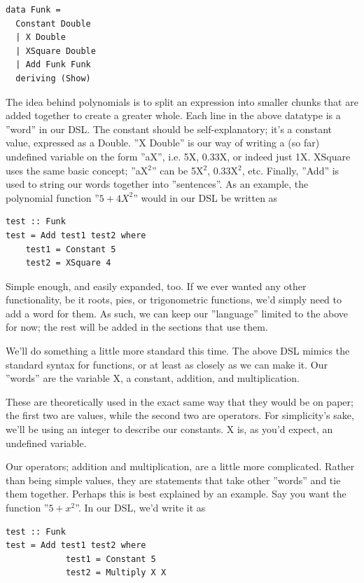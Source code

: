 \begin{verbatim}
data Funk =
  Constant Double
  | X Double
  | XSquare Double
  | Add Funk Funk
  deriving (Show)
\end{verbatim}

The idea behind polynomials is to split an expression into smaller chunks that are added together to create a greater whole. Each line in the above datatype is a ''word'' in our DSL. The constant should be self-explanatory; it's a constant value, expressed as a Double. ''X Double'' is our way of writing a (so far) undefined variable on the form ''aX'', i.e. 5X, 0.33X, or indeed just 1X. XSquare uses the same basic concept; ''aX$^2$'' can be 5X$^2$, 0.33X$^2$, etc.
Finally, ''Add'' is used to string our words together into ''sentences''. As an example, the polynomial function ''$5 + 4X^2$'' would in our DSL be written as
\begin{verbatim}
test :: Funk
test = Add test1 test2 where
    test1 = Constant 5
    test2 = XSquare 4
\end{verbatim}
Simple enough, and easily expanded, too. If we ever wanted any other functionality, be it roots, pies, or trigonometric functions, we'd simply need to add a word for them. As such, we can keep our ''language'' limited to the above for now; the rest will be added in the sections that use them.

\iffalse
We'll do something a little more standard this time. The above DSL mimics the standard syntax for functions, or at least as closely as we can make it. Our ''words'' are the variable X, a constant, addition, and multiplication.

These are theoretically used in the exact same way that they would be on paper; the first two are values, while the second two are operators. For simplicity's sake, we'll be using an integer to describe our constants. X is, as you'd expect, an undefined variable.

Our operators; addition and multiplication, are a little more complicated. Rather than being simple values, they are statements that take other ''words'' and tie them together. Perhaps this is best explained by an example. Say you want the function ''$5 + x^2$''. In our DSL, we'd write it as
\begin{verbatim}
test :: Funk
test = Add test1 test2 where 
            test1 = Constant 5
            test2 = Multiply X X
\end{verbatim}

